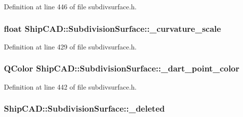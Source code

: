 Definition at line 446 of file subdivsurface.\+h.

\subsubsection[{\texorpdfstring{\+\_\+curvature\+\_\+scale}{_curvature_scale}}]{\setlength{\rightskip}{0pt plus 5cm}float Ship\+C\+A\+D\+::\+Subdivision\+Surface\+::\+\_\+curvature\+\_\+scale\hspace{0.3cm}{\ttfamily [protected]}}\hypertarget{classShipCAD_1_1SubdivisionSurface_acf241b41a8ca897306decbbab8e44c69}{}\label{classShipCAD_1_1SubdivisionSurface_acf241b41a8ca897306decbbab8e44c69}


Definition at line 429 of file subdivsurface.\+h.

\subsubsection[{\texorpdfstring{\+\_\+dart\+\_\+point\+\_\+color}{_dart_point_color}}]{\setlength{\rightskip}{0pt plus 5cm}Q\+Color Ship\+C\+A\+D\+::\+Subdivision\+Surface\+::\+\_\+dart\+\_\+point\+\_\+color\hspace{0.3cm}{\ttfamily [protected]}}\hypertarget{classShipCAD_1_1SubdivisionSurface_a45054fd2d0065a342828bcd675e91307}{}\label{classShipCAD_1_1SubdivisionSurface_a45054fd2d0065a342828bcd675e91307}


Definition at line 442 of file subdivsurface.\+h.

\subsubsection[{\texorpdfstring{\+\_\+deleted}{_deleted}}]{ Ship\+C\+A\+D\+::\+Subdivision\+Surface\+::\+\_\+deleted\hspace{0.3cm}{\ttfamily [protected]}}\hypertarget{classShipCAD_1_1SubdivisionSurface_a7ffa4a7be62b7e5931dd70fce9c885ee}{}\label{classShipCAD_1_1SubdivisionSurface_a7ffa4a7be62b7e5931dd70fce9c885ee}


